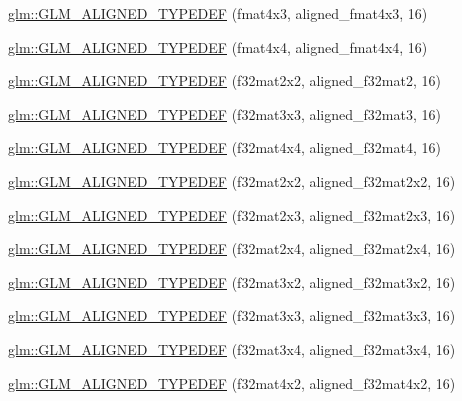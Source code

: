 \begin{DoxyCompactItemize}
\item 
\hyperlink{group__gtx__type__aligned_ga7c117e3ecca089e10247b1d41d88aff9}{glm\+::\+G\+L\+M\+\_\+\+A\+L\+I\+G\+N\+E\+D\+\_\+\+T\+Y\+P\+E\+D\+E\+F} (fmat4x3, aligned\+\_\+fmat4x3, 16)
\item 
\hyperlink{group__gtx__type__aligned_ga07c75cd04ba42dc37fa3e105f89455c5}{glm\+::\+G\+L\+M\+\_\+\+A\+L\+I\+G\+N\+E\+D\+\_\+\+T\+Y\+P\+E\+D\+E\+F} (fmat4x4, aligned\+\_\+fmat4x4, 16)
\item 
\hyperlink{group__gtx__type__aligned_ga65ff0d690a34a4d7f46f9b2eb51525ee}{glm\+::\+G\+L\+M\+\_\+\+A\+L\+I\+G\+N\+E\+D\+\_\+\+T\+Y\+P\+E\+D\+E\+F} (f32mat2x2, aligned\+\_\+f32mat2, 16)
\item 
\hyperlink{group__gtx__type__aligned_gadd8ddbe2bf65ccede865ba2f510176dc}{glm\+::\+G\+L\+M\+\_\+\+A\+L\+I\+G\+N\+E\+D\+\_\+\+T\+Y\+P\+E\+D\+E\+F} (f32mat3x3, aligned\+\_\+f32mat3, 16)
\item 
\hyperlink{group__gtx__type__aligned_gaf18dbff14bf13d3ff540c517659ec045}{glm\+::\+G\+L\+M\+\_\+\+A\+L\+I\+G\+N\+E\+D\+\_\+\+T\+Y\+P\+E\+D\+E\+F} (f32mat4x4, aligned\+\_\+f32mat4, 16)
\item 
\hyperlink{group__gtx__type__aligned_ga66339f6139bf7ff19e245beb33f61cc8}{glm\+::\+G\+L\+M\+\_\+\+A\+L\+I\+G\+N\+E\+D\+\_\+\+T\+Y\+P\+E\+D\+E\+F} (f32mat2x2, aligned\+\_\+f32mat2x2, 16)
\item 
\hyperlink{group__gtx__type__aligned_ga1558a48b3934011b52612809f443e46d}{glm\+::\+G\+L\+M\+\_\+\+A\+L\+I\+G\+N\+E\+D\+\_\+\+T\+Y\+P\+E\+D\+E\+F} (f32mat2x3, aligned\+\_\+f32mat2x3, 16)
\item 
\hyperlink{group__gtx__type__aligned_gaa52e5732daa62851627021ad551c7680}{glm\+::\+G\+L\+M\+\_\+\+A\+L\+I\+G\+N\+E\+D\+\_\+\+T\+Y\+P\+E\+D\+E\+F} (f32mat2x4, aligned\+\_\+f32mat2x4, 16)
\item 
\hyperlink{group__gtx__type__aligned_gac09663c42566bcb58d23c6781ac4e85a}{glm\+::\+G\+L\+M\+\_\+\+A\+L\+I\+G\+N\+E\+D\+\_\+\+T\+Y\+P\+E\+D\+E\+F} (f32mat3x2, aligned\+\_\+f32mat3x2, 16)
\item 
\hyperlink{group__gtx__type__aligned_ga3f510999e59e1b309113e1d561162b29}{glm\+::\+G\+L\+M\+\_\+\+A\+L\+I\+G\+N\+E\+D\+\_\+\+T\+Y\+P\+E\+D\+E\+F} (f32mat3x3, aligned\+\_\+f32mat3x3, 16)
\item 
\hyperlink{group__gtx__type__aligned_ga2c9c94f0c89cd71ce56551db6cf4aaec}{glm\+::\+G\+L\+M\+\_\+\+A\+L\+I\+G\+N\+E\+D\+\_\+\+T\+Y\+P\+E\+D\+E\+F} (f32mat3x4, aligned\+\_\+f32mat3x4, 16)
\item 
\hyperlink{group__gtx__type__aligned_ga99ce8274c750fbfdf0e70c95946a2875}{glm\+::\+G\+L\+M\+\_\+\+A\+L\+I\+G\+N\+E\+D\+\_\+\+T\+Y\+P\+E\+D\+E\+F} (f32mat4x2, aligned\+\_\+f32mat4x2, 16)

\end{DoxyCompactItemize}
